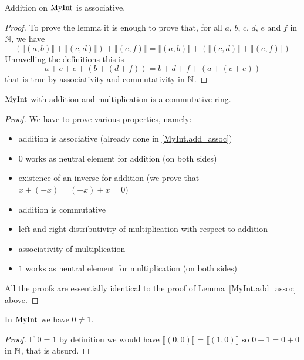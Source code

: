 \begin{lemma}
    \label{MyInt.add_assoc}
    \leanok
    Addition on $\mathrm{MyInt}$ is associative.
\end{lemma}
\begin{proof}
    \leanok
To prove the lemma it is enough to prove that, for all $a$, $b$, $c$, $d$, $e$ and $f$ in $\mathbb{N}$, we have
\[
(\llbracket (a, b) \rrbracket+ \llbracket (c, d) \rrbracket) + \llbracket (e, f) \rrbracket = \llbracket (a, b) \rrbracket + (\llbracket (c, d) \rrbracket + \llbracket (e, f) \rrbracket)
\]
Unravelling the definitions this is
\[
a + c + e + (b + (d + f)) = b + d + f + (a + (c + e))
\]
that is true by associativity and commutativity in $\mathbb{N}$.
\end{proof}

\begin{proposition}
    \label{MyInt.commRing}
    \leanok
    $\mathrm{MyInt}$ with addition and multiplication is a commutative ring.
\end{proposition}
\begin{proof}
    \leanok
    We have to prove various properties, namely:
    \begin{itemize}
        \item addition is associative (already done in \ref{MyInt.add_assoc})
        \item $0$ works as neutral element for addition (on both sides)
        \item existence of an inverse for addition (we prove that $x + (-x) = (-x) + x = 0$)
        \item addition is commutative
        \item left and right distributivity of multiplication with respect to addition
        \item associativity of multiplication
        \item $1$ works as neutral element for multiplication (on both sides)
    \end{itemize}
    All the proofs are essentially identical to the proof of Lemma~\ref{MyInt.add_assoc} above.
\end{proof}

\begin{lemma}
    \label{MyInt.zero_ne_one}
    \leanok
In $\mathrm{MyInt}$ we have $0 \neq 1$.
\end{lemma}
\begin{proof}
    \leanok
    If $0 = 1$ by definition we would have $\llbracket (0,0) \rrbracket = \llbracket (1,0) \rrbracket$
    so $0+1=0+0$ in $\mathbb{N}$, that is absurd.
\end{proof}

